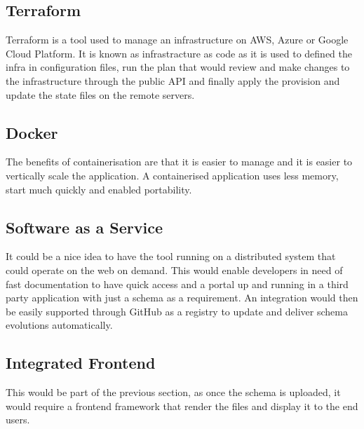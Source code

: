 \subsection{Terraform}
\label{s:Terraform}
Terraform is a tool used to manage an infrastructure on AWS, Azure or Google
Cloud Platform. It is known as infrastracture as code as it is used to defined
the infra in configuration files, run the plan that would review and make
changes to the infrastructure through the public API and finally apply the
provision and update the state files on the remote servers.

\subsection{Docker}
\label{s:Docker}
The benefits of containerisation are that it is easier to manage and it is
easier to vertically scale the application. A containerised application uses less
memory, start much quickly and enabled portability.

\subsection{Software as a Service}
\label{s:SaaS}
It could be a nice idea to have the tool running on a distributed system that
could operate on the web on demand. This would enable developers in need of fast
documentation to have quick access and a portal up and running in a third party
application with just a schema as a requirement. An integration would then be
easily supported through GitHub as a registry to update and deliver schema
evolutions automatically.

\subsection{Integrated Frontend}
\label{s:Integrated-Frontend}
This would be part of the previous section, as once the schema is uploaded, it
would require a frontend framework that render the files and display it to the
end users.

